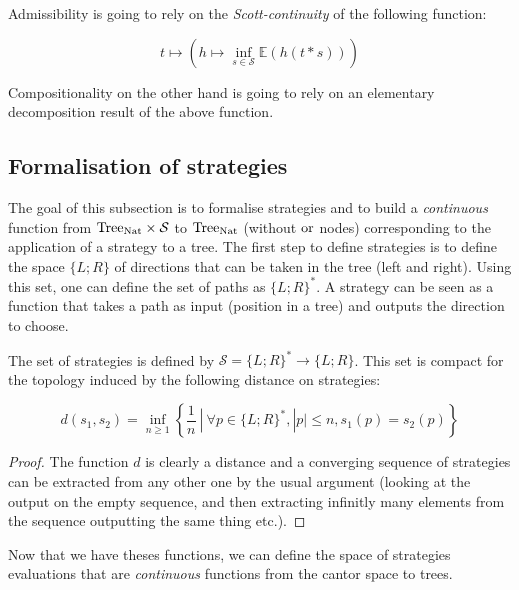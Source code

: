 Admissibility is going to rely on the \emph{Scott-continuity} 
of the following function:

\begin{equation*}
    t \mapsto \left(h \mapsto \inf_{s \in \mathcal{S}} \mathbb{E} (h
(t*s))\right)
\end{equation*}

Compositionality on the other hand is going to rely on an elementary 
decomposition result of the above function.

\subsection{Formalisation of strategies} 

The goal of this subsection is to formalise strategies and 
to build a \emph{continuous} function from $\textnormal{Tree}_{\textnormal{Nat}} \times \mathcal{S}$
to $\textnormal{Tree}_{\textnormal{Nat}}$ (without $\operatorname{or}$ nodes) corresponding to the 
application of a strategy to a tree.
The first step to define strategies is to define the space 
$\{ L; R\}$ of directions that can be taken in the tree (left and right).
Using this set, one can define the set of paths as $\{ L; R \}^*$. A 
strategy can be seen as a function that takes a path as input (position 
in a tree) and outputs the direction to choose.

\begin{adefinition}[Strategies]
     The set of strategies is 
     defined by $\mathcal{S} = \{ L;R\}^* \to \{ L; R\}$.
     This set is compact for the topology induced by the 
     following distance on strategies:

     \begin{equation*}
         d(s_1,s_2) = \inf_{n \geq 1} \left\{ \frac{1}{n} ~|~ \forall p \in \{ L;R\}^*,
                                         |p| \leq n, s_1(p) = s_2(p) \right\}
     \end{equation*}
\end{adefinition}

\begin{proof}
    The function $d$ is clearly a distance and a converging sequence 
    of strategies can be extracted from any other one by the usual argument 
    (looking at the output on the empty sequence, and then extracting
    infinitly many elements from the sequence outputting the same thing etc.).
\end{proof}

Now that we have theses functions, we can define the space 
of strategies evaluations that are \emph{continuous}
functions from the cantor space to trees. 

